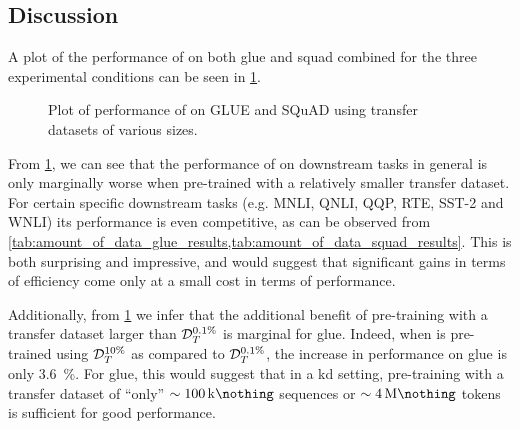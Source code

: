 \subsection{Discussion}
\label{subsec:size_of_transfer_dataset_discussion}
A plot of the performance of \bertstudent on both \gls{glue} and \gls{squad} combined for the three experimental conditions can be seen in \cref{fig:amount_of_data_barplot}.

\begin{figure}[ht!]
    \begin{center}
        
    \end{center}
    \caption[Plot of performance on GLUE and SQuAD using differently sized transfer datasets]{Plot of performance of \bertstudent on GLUE and SQuAD using transfer datasets of various sizes.}
    \label{fig:amount_of_data_barplot}
\end{figure}


From \cref{fig:amount_of_data_barplot}, we can see that the performance of \bertstudent on downstream tasks in general is only marginally worse when pre-trained with a relatively smaller transfer dataset. For certain specific downstream tasks (e.g. MNLI,  QNLI, QQP, RTE, SST-2 and WNLI) its performance is even competitive, as can be observed from \cref{tab:amount_of_data_glue_results,tab:amount_of_data_squad_results}. This is both surprising and impressive, and would suggest that significant gains in terms of efficiency come only at a small cost in terms of performance.

Additionally, from \cref{fig:amount_of_data_barplot} we infer that the additional benefit of pre-training with a transfer dataset larger than $\mathcal{D}_T^{0.1\%}$ is marginal for \gls{glue}. Indeed, when \bertstudent is pre-trained using $\mathcal{D}_T^{10\%}$ as compared to $\mathcal{D}_T^{0.1\%}$, the increase in performance on \gls{glue} is only \SI{3.6}{\percent}. For \gls{glue}, this would suggest that in a \gls{kd} setting, pre-training with a transfer dataset of ``only'' $\sim \SI{100}{\kilo\nothing}$ sequences or $\sim \SI{4}{\mega\nothing}$ tokens is sufficient for good performance.

